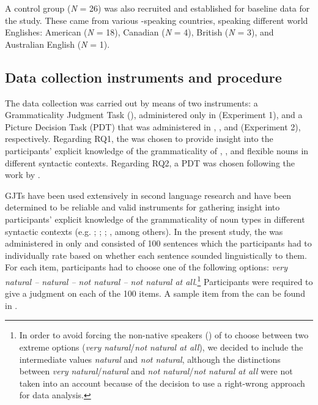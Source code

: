 \documentclass[output=paper]{langsci/langscibook}
\begin{document}
A control group (\textit{N} = 26) was also recruited and established for baseline data for the study. These  came from various -speaking countries, speaking different world Englishes: American  (\textit{N} = 18), Canadian  (\textit{N} = 4), British  (\textit{N} = 3), and  {Australian English} (\textit{N} = 1).  


\subsection{Data collection instruments and procedure}


The data collection was carried out by means of two instruments: a Grammaticality Judgment Task (), administered only in  (Experiment 1), and a Picture Decision Task (PDT) that was administered in , , and  (Experiment 2), respectively. Regarding RQ1, the  was chosen to provide insight into the participants’ explicit knowledge of the grammaticality of , , and flexible nouns in different syntactic contexts. Regarding RQ2, a PDT was chosen following the work by \citet{BarnerSnedeker2005}.

 GJTs have been used extensively in second language  research and have been determined to be reliable and valid instruments for gathering insight into participants’ explicit knowledge of the grammaticality of noun types in different syntactic contexts (e.g. \citealt{CowanHatasa1994}; \citealt{Gass1994}; \citealt{Cowart1997}; \citealt{IoninZyzik2014}, among others). In the present study, the  was administered in  only and  consisted of 100 sentences which the participants had to individually rate based on whether each sentence sounded linguistically  to them. For each item, participants had to choose one of the following options: \textit{very natural – natural – not natural – not natural at all}.\footnote{In order to avoid forcing the non-native speakers () of  to choose between two extreme options (\textit{very natural}/\textit{not natural at all}), we decided to include the intermediate values \textit{natural} and \textit{not natural}, although the distinctions between \textit{very natural}/\textit{natural} and \textit{not natural}/\textit{not natural at all} were not taken into an account because of the decision to use a right-wrong approach for data analysis.} Participants were required to give a judgment on each of the 100 items. A sample item from the  can be found in .
\end{document}
